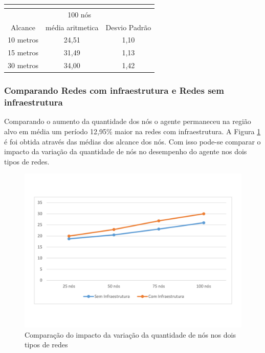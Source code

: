 \begin{table}[!htb]
\begin{minipage}{.5\linewidth}
\begin{tabular}{|c|c|c|}
			\multicolumn{3}{|c|}{} \\ \hline


			\multicolumn{3}{|c|}{100 nós} \\ \hline
			Alcance   & média aritmetica &	Desvio Padrão   \\ \hline
			10 metros &	24,51 & 1,10   \\ \hline
			15 metros &	31,49 & 1,13   \\ \hline
			30 metros &	34,00 & 1,42  \\ \hline

		\end{tabular}

	    \end{minipage} 
	\end{table}  


\subsubsection{Comparando Redes com infraestrutura e Redes sem infraestrutura}

Comparando o aumento da quantidade dos nós o agente permaneceu na região alvo em média um período 12,95\% maior na redes com infraestrutura. A Figura \ref{fig:comparacaoVariacaoNos} é foi obtida através das médias dos alcance dos nós. Com isso pode-se comparar o impacto da variação da quantidade de nós no desempenho do agente nos dois tipos de redes. 

\begin{figure}[htbp]
	\centering
	\includegraphics[scale=0.34]{resultados/graficos/comparacaoVariacaoNos.pdf}
	\caption{Comparação do impacto da variação da quantidade de nós nos dois tipos de redes}
	\label{fig:comparacaoVariacaoNos}
\end{figure}  

